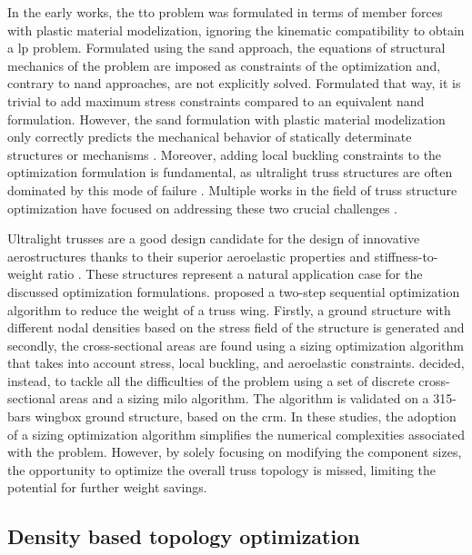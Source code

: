In the early works, the \gls{tto} problem was formulated in terms of member forces \cite{dorn_automatic_1964, hemp_optimum_1973} with plastic material modelization, ignoring the kinematic compatibility to obtain a \gls{lp} problem. Formulated using the \gls{sand} approach, the equations of structural mechanics of the problem are imposed as constraints of the optimization and, contrary to \gls{nand} approaches, are not explicitly solved. Formulated that way, it is trivial to add maximum stress constraints compared to an equivalent \gls{nand} formulation. However, the \gls{sand} formulation with plastic material modelization only correctly predicts the mechanical behavior of statically determinate structures or mechanisms \cite{kirsch_optimal_1989, rozvany_layout_1995}. Moreover, adding local buckling constraints to the optimization formulation is fundamental, as ultralight truss structures are often dominated by this mode of failure \cite{sigmund_non-optimality_2016}. Multiple works in the field of truss structure optimization have focused on addressing these two crucial challenges \cite{kirsch_optimal_1980,cheng_aspects_1995,achtziger_local_1999}.

Ultralight trusses are a good design candidate for the design of innovative aerostructures thanks to their superior aeroelastic properties and stiffness-to-weight ratio \cite{cramer_elastic_2019}. These structures represent a natural application case for the discussed optimization formulations. \cite{opgenoord_aeroelastic_2018, opgenoord_design_2019} proposed a two-step sequential optimization algorithm to reduce the weight of a truss wing. Firstly, a ground structure with different nodal densities based on the stress field of the structure is generated and secondly, the cross-sectional areas are found using a sizing optimization algorithm that takes into account stress, local buckling, and aeroelastic constraints. \cite{shahabsafa_novel_2018} decided, instead, to tackle all the difficulties of the problem using a set of discrete cross-sectional areas and a sizing \gls{milo} algorithm. The algorithm is validated on a 315-bars wingbox ground structure, based on the \gls{crm}. In these studies, the adoption of a sizing optimization algorithm simplifies the numerical complexities associated with the problem. However, by solely focusing on modifying the component sizes, the opportunity to optimize the overall truss topology is missed, limiting the potential for further weight savings.

\subsection{Density based topology optimization}

